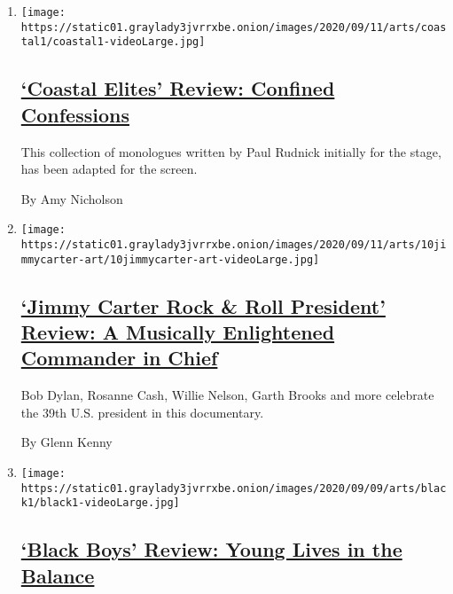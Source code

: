 \begin{enumerate}
\def\labelenumi{\arabic{enumi}.}
\item
  \texttt{[image: https://static01.graylady3jvrrxbe.onion/images/2020/09/11/arts/coastal1/coastal1-videoLarge.jpg]}

  \hypertarget{coastal-elites-review-confined-confessions}{%
  \subsection{\texorpdfstring{\href{/2020/09/10/movies/coastal-elites-review.html}{`Coastal
  Elites' Review: Confined
  Confessions}}{`Coastal Elites' Review: Confined Confessions}}\label{coastal-elites-review-confined-confessions}}

  This collection of monologues written by Paul Rudnick initially for
  the stage, has been adapted for the screen.

  By Amy Nicholson
\item
  \texttt{[image: https://static01.graylady3jvrrxbe.onion/images/2020/09/11/arts/10jimmycarter-art/10jimmycarter-art-videoLarge.jpg]}

  \hypertarget{jimmy-carter-rock--roll-president-review-a-musically-enlightened-commander-in-chief}{%
  \subsection{\texorpdfstring{\href{/2020/09/10/movies/jimmy-carter-rock-roll-president-review.html}{`Jimmy
  Carter Rock \& Roll President' Review: A Musically Enlightened
  Commander in
  Chief}}{`Jimmy Carter Rock \& Roll President' Review: A Musically Enlightened Commander in Chief}}\label{jimmy-carter-rock--roll-president-review-a-musically-enlightened-commander-in-chief}}

  Bob Dylan, Rosanne Cash, Willie Nelson, Garth Brooks and more
  celebrate the 39th U.S. president in this documentary.

  By Glenn Kenny
\item
  \texttt{[image: https://static01.graylady3jvrrxbe.onion/images/2020/09/09/arts/black1/black1-videoLarge.jpg]}

  \hypertarget{black-boys-review-young-lives-in-the-balance}{%
  \subsection{\texorpdfstring{\href{/2020/09/10/movies/black-boys-review.html}{`Black
  Boys' Review: Young Lives in the
  Balance}}{`Black Boys' Review: Young Lives in the Balance}}\label{black-boys-review-young-lives-in-the-balance}}


\end{enumerate}
